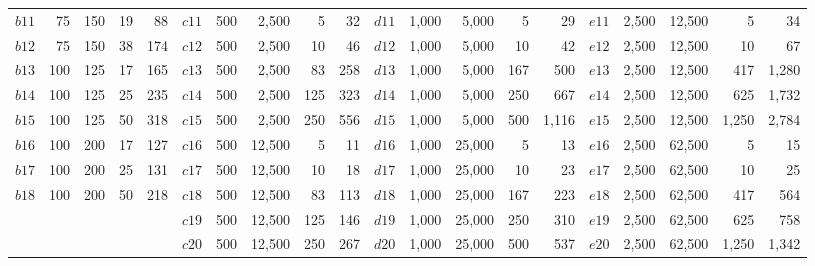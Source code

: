 \documentclass[journal]{IEEEtran}
\begin{document}
\begin{table}[h]
\begin{adjustbox}{width=\textwidth}
\begin{tabular}{lrrrr|lrrrr|lrrrr|lrrrr}
$b11$ & 75 & 150 & 19 & 88& $c11$ & 500 & 2,500 & 5 &32&  $d11$ & 1,000 & 5,000 & 5 & 29& $e11$ & 2,500 & 12,500 & 5 &34\\
$b12$ & 75 & 150 & 38 & 174& $c12$ & 500 & 2,500 & 10 & 46&  $d12$ & 1,000 & 5,000 & 10 & 42& $e12$ & 2,500 & 12,500 & 10 & 67\\
$b13$ & 100 & 125 & 17 & 165& $c13$ & 500 & 2,500 & 83 & 258&  $d13$ & 1,000 & 5,000 & 167 & 500& $e13$ & 2,500 & 12,500 & 417 & 1,280\\
$b14$ & 100 & 125 & 25 & 235& $c14$ & 500 & 2,500 & 125 & 323&  $d14$ & 1,000 & 5,000 & 250 & 667& $e14$ & 2,500 & 12,500 & 625 & 1,732\\
$b15$ & 100 & 125 & 50 & 318& $c15$ & 500 & 2,500 & 250 & 556&  $d15$ & 1,000 & 5,000 & 500 & 1,116& $e15$ & 2,500 & 12,500 & 1,250 & 2,784\\
$b16$ & 100 & 200 & 17 & 127& $c16$ & 500 & 12,500 & 5 & 11&  $d16$ & 1,000 & 25,000 & 5 & 13& $e16$ & 2,500 & 62,500 & 5 & 15\\
$b17$ & 100 & 200 & 25 & 131& $c17$ & 500 & 12,500 & 10 & 18&  $d17$ & 1,000 & 25,000 & 10 & 23& $e17$ & 2,500 & 62,500 & 10 & 25\\
$b18$ & 100 & 200 & 50 & 218& $c18$ & 500 & 12,500 & 83 & 113&  $d18$ & 1,000 & 25,000 & 167 & 223& $e18$ & 2,500 & 62,500 & 417 & 564\\
&&&&& $c19$ & 500 & 12,500 & 125 & 146 &$d19$ & 1,000 & 25,000 & 250 & 310& $e19$ & 2,500 & 62,500 & 625 & 758\\
&&&&& $c20$ & 500 & 12,500 & 250 & 267 &$d20$ & 1,000 & 25,000 & 500 & 537& $e20$ & 2,500 & 62,500 & 1,250 & 1,342\\
\bottomrule
\end{tabular}
\end{adjustbox}
\end{table}
\end{document}
